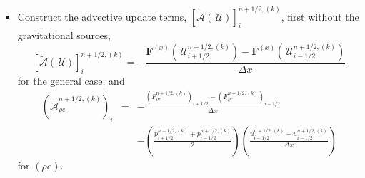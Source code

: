 \documentclass[linenumbers]{aastex631}
\newcommand{\Uc}{{\,\bm{\mathcal{U}}}}
\newcommand{\Fb}{\mathbf{F}}
\newcommand{\xv}{{(x)}}
\newcommand{\Advt}[1]{{\left [\boldsymbol{\mathcal{\tilde{A}}} \left(#1\right)\right]}}
\begin{document}
\begin{itemize}
\begin{itemize}
\begin{itemize}
    \item Construct the advective update terms, $\Advt{\Uc}^{n+1/2,(k)}_{i}$,
      first without the gravitational sources,
      \begin{equation}
        \Advt{\Uc}^{n+1/2,(k)}_{i} =
          - \frac{\Fb^\xv(\Uc^{n+1/2,(k)}_{i+1/2}) - \Fb^\xv(\Uc^{n+1/2,(k)}_{i-1/2})}{\Delta x}
      \end{equation}
      for the general case, and
      \begin{eqnarray}
        \left(\tilde{\mathcal{A}}_{\rho e}^{n+1/2,(k)}\right)_{i} &=&
          - \frac{\left(F_{\rho e}^{n+1/2,(k)}\right)_{i+1/2} - \left(F_{\rho e}^{n+1/2,(k)}\right)_{i-1/2}}{\Delta x} \nonumber \\
          &&- \left (\frac{p_{i+1/2}^{n+1/2,(k)} + p_{i-1/2}^{n+1/2,(k)}}{2} \right )
          \left(\frac{u_{i+1/2}^{n+1/2,(k)} - u_{i-1/2}^{n+1/2,(k)}}{\Delta x}\right)
      \end{eqnarray}
      for $(\rho e)$.


\end{itemize}
\end{itemize}
\end{itemize}
\end{document}
